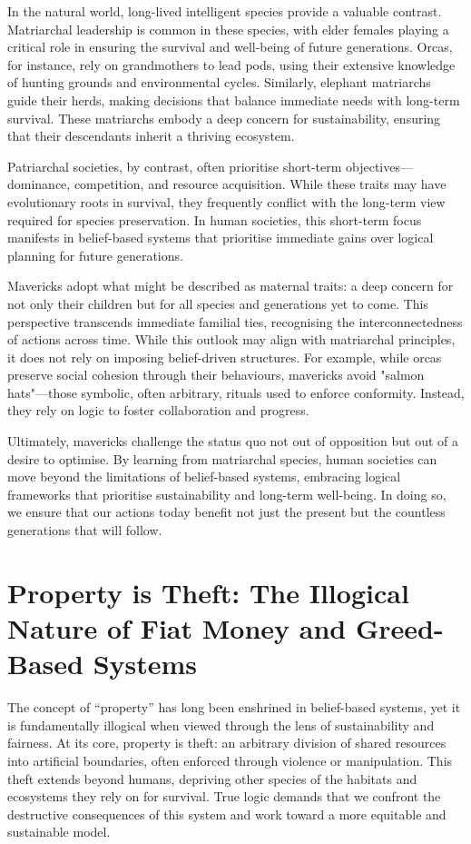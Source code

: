 \documentclass[12pt]{article}
\begin{document}
In the natural world, long-lived intelligent species provide a valuable contrast. Matriarchal leadership is common in these species, with elder females playing a critical role in ensuring the survival and well-being of future generations. Orcas, for instance, rely on grandmothers to lead pods, using their extensive knowledge of hunting grounds and environmental cycles. Similarly, elephant matriarchs guide their herds, making decisions that balance immediate needs with long-term survival. These matriarchs embody a deep concern for sustainability, ensuring that their descendants inherit a thriving ecosystem.

Patriarchal societies, by contrast, often prioritise short-term objectives—dominance, competition, and resource acquisition. While these traits may have evolutionary roots in survival, they frequently conflict with the long-term view required for species preservation. In human societies, this short-term focus manifests in belief-based systems that prioritise immediate gains over logical planning for future generations.

Mavericks adopt what might be described as maternal traits: a deep concern for not only their children but for all species and generations yet to come. This perspective transcends immediate familial ties, recognising the interconnectedness of actions across time. While this outlook may align with matriarchal principles, it does not rely on imposing belief-driven structures. For example, while orcas preserve social cohesion through their behaviours, mavericks avoid "salmon hats"—those symbolic, often arbitrary, rituals used to enforce conformity. Instead, they rely on logic to foster collaboration and progress.

Ultimately, mavericks challenge the status quo not out of opposition but out of a desire to optimise. By learning from matriarchal species, human societies can move beyond the limitations of belief-based systems, embracing logical frameworks that prioritise sustainability and long-term well-being. In doing so, we ensure that our actions today benefit not just the present but the countless generations that will follow.

\section*{Property is Theft: The Illogical Nature of Fiat Money and Greed-Based Systems}

The concept of “property” has long been enshrined in belief-based systems, yet it is fundamentally illogical when viewed through the lens of sustainability and fairness. At its core, property is theft: an arbitrary division of shared resources into artificial boundaries, often enforced through violence or manipulation. This theft extends beyond humans, depriving other species of the habitats and ecosystems they rely on for survival. True logic demands that we confront the destructive consequences of this system and work toward a more equitable and sustainable model.
\end{document}
